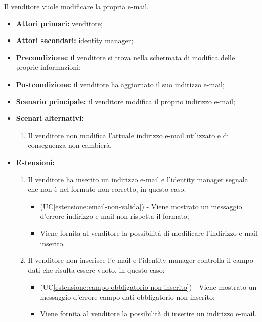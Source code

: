 Il venditore vuole modificare la propria e-mail.
\begin{itemize}
    \item \textbf{Attori primari:} venditore;
    \item \textbf{Attori secondari:} identity manager;
    \item \textbf{Precondizione:} il venditore si trova nella schermata di modifica delle proprie informazioni;
    \item \textbf{Postcondizione:} il venditore ha aggiornato il suo indirizzo e-mail;
    \item \textbf{Scenario principale:} il venditore modifica il proprio indirizzo e-mail;
    \item \textbf{Scenari alternativi:}
    \begin{enumerate}[label=\lett]
    	\item Il venditore non modifica l'attuale indirizzo e-mail utilizzato e di conseguenza non cambierà.
    \end{enumerate}
    \item \textbf{Estensioni:}
    \begin{enumerate}[label=\lett]
    	\item Il venditore ha inserito un indirizzo e-mail e l'identity manager segnala che non è nel formato non corretto, in questo caso:
    	\begin{itemize}
    		\item (UC\ref{estensione:email-non-valida}) - Viene mostrato un messaggio d'errore indirizzo e-mail non rispetta il formato;
    		\item Viene fornita al venditore la possibilità di modificare l'indirizzo e-mail inserito.
    	\end{itemize}
	    \item Il venditore non inserisce l'e-mail e l'identity manager controlla il campo dati che risulta essere vuoto, in questo caso:
	    \begin{itemize}
	    	\item (UC\ref{estensione:campo-obbligatorio-non-inserito}) - Viene mostrato un messaggio d'errore campo dati obbligatorio non inserito;
	    	\item Viene fornita al venditore la possibilità di inserire un indirizzo e-mail.
	    \end{itemize}
    \end{enumerate} 
\end{itemize}

\label{modifica-informazioni-venditore.password}

